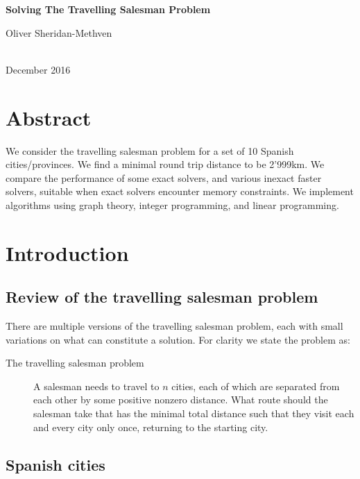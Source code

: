 \documentclass[a4paper, 11pt]{article}
\begin{document}
\begin{center}
\begin{Large}
\textbf{Solving The Travelling Salesman Problem}\\
\end{Large}
\vspace{1ex}
\begin{large}
Oliver Sheridan-Methven 
\end{large}\\
December 2016 \\
\end{center}

\section*{Abstract}
We consider the travelling salesman problem for a set of 10 Spanish cities/provinces. We find a minimal round trip distance to be 2'999\:km. We compare the performance of some exact solvers, and various inexact faster solvers, suitable when exact solvers encounter memory constraints. We implement algorithms using graph theory, integer programming, and linear programming.

\section{Introduction}

\subsection{Review of the travelling salesman problem}
\label{subsec:review_of_tsp}

There are multiple versions of the travelling salesman problem, each with small variations on what can constitute a solution. For clarity we state the problem as:
\begin{description}
\item[The travelling salesman problem] A salesman needs to travel to $ n $ cities, each of which are separated from each other by some positive nonzero distance. What route should the salesman take that has the minimal total distance such that they visit each and every city only once, returning to the starting city.
\end{description}


\subsection{Spanish cities}
\label{subsec:spanish_cities}
\end{document}

